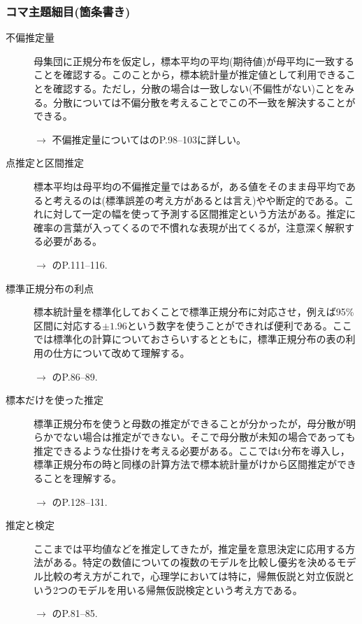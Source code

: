 \subsubsection{コマ主題細目(箇条書き)}
\begin{description}

\item[不偏推定量]母集団に正規分布を仮定し，標本平均の平均(期待値)が母平均に一致することを確認する。このことから，標本統計量が推定値として利用できることを確認する。ただし，分散の場合は一致しない(不偏性がない)ことをみる。分散については不偏分散を考えることでこの不一致を解決することができる。
\begin{flushright}
    $\to$ 不偏推定量については\citet{Yamada2004}のP.98--103に詳しい。
\end{flushright}

\item[点推定と区間推定]標本平均は母平均の不偏推定量ではあるが，ある値をそのまま母平均であると考えるのは(標準誤差の考え方があるとは言え)やや断定的である。これに対して一定の幅を使って予測する区間推定という方法がある。推定に確率の言葉が入ってくるので不慣れな表現が出てくるが，注意深く解釈する必要がある。
\begin{flushright}
    $\to$ \citet{川端201408}のP.111--116.
\end{flushright}

\item[標準正規分布の利点]標本統計量を標準化しておくことで標準正規分布に対応させ，例えば95\%区間に対応する$\pm 1.96$という数字を使うことができれば便利である。ここでは標準化の計算についておさらいするとともに，標準正規分布の表の利用の仕方について改めて理解する。
\begin{flushright}
    $\to$ \citet{Yamada2004}のP.86--89.
\end{flushright}

\item[標本だけを使った推定]標準正規分布を使うと母数の推定ができることが分かったが，母分散が明らかでない場合は推定ができない。そこで母分散が未知の場合であっても推定できるような仕掛けを考える必要がある。ここではt分布を導入し，標準正規分布の時と同様の計算方法で標本統計量がけから区間推定ができることを理解する。

\begin{flushright}
    $\to$ \citet{Yamada2004}のP.128--131.
\end{flushright}


\item[推定と検定]ここまでは平均値などを推定してきたが，推定量を意思決定に応用する方法がある。特定の数値についての複数のモデルを比較し優劣を決めるモデル比較の考え方がこれで，心理学においては特に，帰無仮説と対立仮説という2つのモデルを用いる帰無仮説検定という考え方である。
\begin{flushright}
    $\to$ \citet{川端201408}のP.81--85.
\end{flushright}


\end{description}
